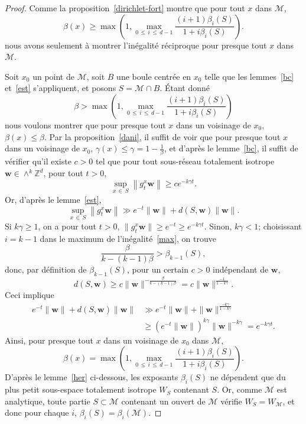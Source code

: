 \documentclass[AHL,Unicode,longabstracts,francais,published]{cedram}
\newcommand{\Z}{\mathbb{Z}}
\newcommand{\bw}{\mathbf{w}}
\newcommand{\cM}{\mathcal{M}}
\begin{document}
\begin{proof}
Comme la proposition~\ref{dirichlet-fort} montre que pour tout $x$ dans $\cM$,
\[
\beta(x) \geq \max\left(1,\max_{0\,\leq\, i\,\leq\,d-1} \frac{(i+1)\beta_i(S)}{1+i\beta_i(S)}\right).
\]
nous avons seulement à montrer l'inégalité réciproque pour presque tout $x$ dans $\cM$.

Soit $x_0$ un point de $\cM$, soit $B$ une boule centrée en $x_0$ telle que les lemmes~\ref{bc} et~\ref{est} s'appliquent, et posons $S=\cM\cap B$. Étant donné
\begin{equation}\label{max}
\beta> \max\left(1,\max_{0\,\leq\,i\,\leq\,d-1}\frac{(i+1)\beta_i(S)}{1+i\beta_i(S)}\right)
\end{equation}
nous voulons montrer que pour presque tout $x$ dans un voisinage de $x_0$, $\beta(x)\leq\beta$. Par la proposition~\ref{dani}, il suffit de voir que pour presque tout $x$ dans un voisinage de $x_0$, $\gamma(x)\leq\gamma=1-\frac{1}{\beta}$, et d'après le lemme~\ref{bc}, il suffit de vérifier qu'il existe $c>0$ tel que pour tout sous-réseau totalement isotrope $\bw\in\wedge^k\Z^d$, pour tout $t>0$,
\[
\sup_{x\,\in\,S}\left\|g_t^x\bw\right\| \geq c e^{-k\gamma t}.
\]
Or, d'après le lemme~\ref{est},
\[
\sup_{x\,\in\,S}\left\|g_t^x\bw\right\| \gg e^{-t}\|\bw\| + d(S,\bw)\|\bw\|.
\]
Si $k\gamma\geq 1$, on a pour tout $t>0$, $\|g_t^x\bw\|\geq e^{-t}\geq e^{-k\gamma t}$. Sinon, $k\gamma< 1$; choisissant $i=k-1$ dans le maximum de l'inégalité~\eqref{max}, on trouve
\[
\frac{\beta}{k-(k -1)\beta}>\beta_{k-1}(S),
\]
donc, par définition de $\beta_{k-1}(S)$, pour un certain $c>0$ indépendant de $\bw$,
\[
d(S,\bw) \geq c \|\bw\|^{-\frac{\beta}{k-(k-1)\beta}} = c \|\bw\|^{\frac{-1}{1-k\gamma}}.
\]
Ceci implique
\begin{align*}
e^{-t}\|\bw\| + d(S,\bw)\|\bw\| & \gg e^{-t}\|\bw\|+\|\bw\|^{\frac{-k\gamma}{1-k\gamma}}\\
& \geq \left(e^{-t}\|\bw\|\right)^{k\gamma}\|\bw\|^{-k\gamma} = e^{-k\gamma t}.
\end{align*}
Ainsi, pour presque tout $x$ dans un voisinage de $x_0$ dans $\cM$,
\[
\beta(x) = \max\left(1,\max_{0\,\leq\,i\,\leq\,d-1}\frac{(i+1)\beta_i(S)}{1+i\beta_i(S)}\right).
\]
D'après le lemme~\ref{her} ci-dessous, les exposants $\beta_i(S)$ ne dépendent que du plus petit sous-espace totalement isotrope $W_S$ contenant $S$. Or, comme $\cM$ est analytique, toute partie $S\subset\cM$ contenant un ouvert de $\cM$ vérifie $W_S=W_{\cM}$, et donc pour chaque $i$, $\beta_i(S)=\beta_i(\cM)$.
\end{proof}
\end{document}
